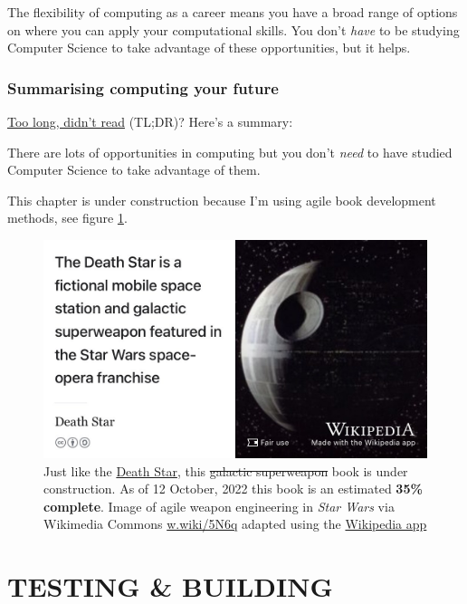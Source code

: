 \documentclass[
]{book}
\begin{document}
The flexibility of computing as a career means you have a broad range of options on where you can apply your computational skills. You don't \emph{have} to be studying Computer Science to take advantage of these opportunities, but it helps.

\hypertarget{tldr6}{%
\section{Summarising computing your future}\label{tldr6}}

\href{https://en.wiktionary.org/wiki/too_long;_didn\%27t_read}{Too long, didn't read} (TL;DR)? Here's a summary:

There are lots of opportunities in computing but you don't \emph{need} to have studied Computer Science to take advantage of them.

This chapter is under construction because I'm using agile book development methods, see figure \ref{fig:deathstar3-fig}.

\begin{figure}

{\centering \includegraphics[width=0.99\linewidth]{images/DeathStar2} 

}

\caption{Just like the \href{https://en.wikipedia.org/wiki/Death_Star}{Death Star}, this \sout{galactic superweapon} book is under construction. As of 12 October, 2022 this book is an estimated \textbf{35\% complete}. Image of agile weapon engineering in \emph{Star Wars} via Wikimedia Commons \href{https://w.wiki/5N6q}{w.wiki/5N6q} adapted using the \href{https://apps.apple.com/gb/app/wikipedia/id324715238}{Wikipedia app}}\label{fig:deathstar3-fig}
\end{figure}

\hypertarget{part-testing-building}{%
\part{TESTING \& BUILDING}\label{part-testing-building}}
\end{document}
